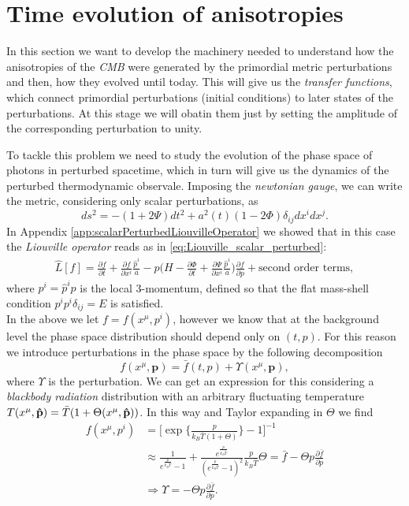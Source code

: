 \section{Time evolution of anisotropies}\label{sec:ThetaTimeEvolution}
In this section we want to develop the machinery needed to understand how the anisotropies of the \emph{CMB} were generated by the primordial metric perturbations and then, how they evolved until today. This will give us the \emph{transfer functions}, which connect primordial perturbations (initial conditions) to later states of the perturbations. At this stage we will obatin them just by setting the amplitude of the corresponding perturbation to unity.

To tackle this problem we need to study the evolution of the phase space of photons in perturbed spacetime, which in turn will give us the dynamics of the perturbed thermodynamic observale. Imposing the \emph{newtonian gauge}, we can write the metric, considering only scalar perturbations, as
$$ds^2 = -(1+2\Psi)dt^2 + a^2(t)(1-2\Phi)\delta_{ij}dx^idx^j.$$
In Appendix \ref{app:scalarPerturbedLiouvilleOperator} we showed that in this case the \emph{Liouville operator} reads as in \eqref{eq:Liouville_scalar_perturbed}:
\begin{align*}
    \hat{L}[f]=\frac{\partial f}{\partial t}+\frac{\partial f}{\partial x^i}\frac{\hat p^i}{a}-p\bigg(H-\frac{\partial \Phi}{\partial t}+\frac{\partial \Psi}{\partial x^i}\frac{\hat p^i}{a}\bigg)\frac{\partial f}{\partial p}+\text{second order terms},
\end{align*}
where $p^i=\hat p^i p$ is the local 3-momentum, defined so that the flat mass-shell condition $p^ip^i\delta_{ij}=E$ is satisfied.\\In the above we let $f=f(x^\mu,p^i)$, however we know that at the background level the phase space distribution should depend only on $(t,p)$. For this reason we introduce perturbations in the phase space by the following decomposition
\begin{equation}\label{eq:phspdist_perturb}
    f(x^\mu,\mathbf p) = \bar f(t,p) + \Upsilon (x^\mu,\mathbf{p}),
\end{equation}
where $\Upsilon$ is the perturbation. We can get an expression for this considering a \emph{blackbody radiation} distribution with an arbitrary fluctuating temperature $T(x^\mu,\mathbf{\hat{p}})=\bar T (1+\Theta(x^\mu,\mathbf{\hat{p}}))$. In this way and Taylor expanding in $\Theta$ we find
\begin{align*}
    f(x^\mu,p^i) &= \bigg[\exp\bigg\{\frac{p}{k_B\bar T(1+\Theta)}\bigg\}-1\bigg]^{-1}\\&\approx\frac{1}{e^{\frac{p}{k_B\bar T}}-1}+\frac{e^{\frac{p}{k_B\bar T}}}{(e^{\frac{p}{k_B\bar T}}-1)^2}\frac{p}{k_B \bar T}\Theta=\bar f-\Theta p \frac{\partial\bar f}{\partial p}\\
    &\Longrightarrow \boxed{\Upsilon = -\Theta p \frac{\partial\bar f}{\partial p}}.
\end{align*}
